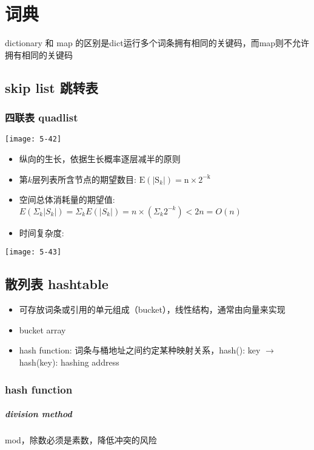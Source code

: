 \chapter{词典}
dictionary 和 map 的区别是dict运行多个词条拥有相同的关键码，而map则不允许拥有相同的关键码

\section{skip list 跳转表}
\subsection{四联表 quadlist}
\texttt{[image: 5-42]}\\
\begin{itemize}
\item 纵向的生长，依据生长概率逐层减半的原则
\item 第$k$层列表所含节点的期望数目: $\mathrm{E}\left(\left|\mathrm{S}_{k}\right|\right)=\mathrm{n} \times 2^{-\mathrm{k}}$
\item 空间总体消耗量的期望值: $E\left(\Sigma_{k}\left|S_{k}\right|\right)=\Sigma_{k} E\left(\left|S_{k}\right|\right)=n \times\left(\Sigma_{k} 2^{-k}\right)<2 n=O(n)$
\item 时间复杂度: 
\end{itemize}

\texttt{[image: 5-43]}

\section{散列表 hashtable}

\begin{itemize}
\item 可存放词条或引用的单元组成（bucket），线性结构，通常由向量来实现
\item bucket array
\item hash function: 词条与桶地址之间约定某种映射关系，hash(): key $\rightarrow$ hash(key): hashing address
\end{itemize}

\subsection{hash function}
\paragraph{division method}
mod，除数必须是素数，降低冲突的风险

